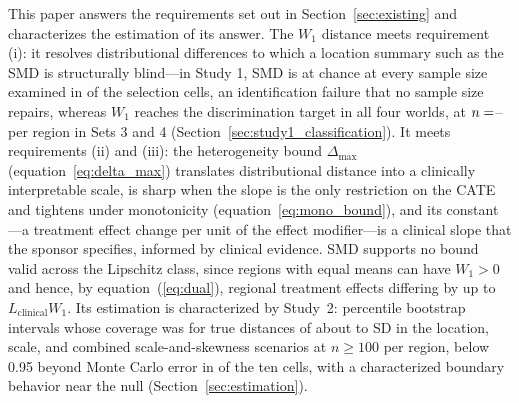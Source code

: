\documentclass[AMA,Times1COL]{WileyNJDv5}
\begin{document}
This paper answers the requirements set out in Section~\ref{sec:existing} and characterizes the estimation of its answer. The $W_1$ distance meets requirement (i): it resolves distributional differences to which a location summary such as the SMD is structurally blind---in Study 1, SMD is at chance at every sample size examined in  of the  selection cells, an identification failure that no sample size repairs, whereas $W_1$ reaches the discrimination target in all four worlds, at $n = \numval{reqnW1minSets34}$-- per region in Sets 3 and 4 (Section~\ref{sec:study1_classification}). It meets requirements (ii) and (iii): the heterogeneity bound \(\Delta_{\max}\) (equation~\ref{eq:delta_max}) translates distributional distance into a clinically interpretable scale, is sharp when the slope is the only restriction on the CATE and tightens under monotonicity (equation~\ref{eq:mono_bound}), and its constant---a treatment effect change per unit of the effect modifier---is a clinical slope that the sponsor specifies, informed by clinical evidence. SMD supports no bound valid across the Lipschitz class, since regions with equal means can have $W_1 > 0$ and hence, by equation~(\ref{eq:dual}), regional treatment effects differing by up to $L_{\text{clinical}} W_1$. Its estimation is characterized by Study~2: percentile bootstrap intervals whose coverage was  for true distances of about  to  SD in the location, scale, and combined scale-and-skewness scenarios at \(n \geq 100\) per region, below 0.95 beyond Monte Carlo error in  of the ten cells, with a characterized boundary behavior near the null (Section~\ref{sec:estimation}).
\end{document}
